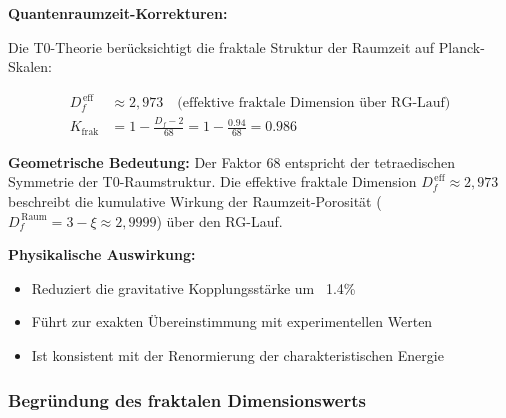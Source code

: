 	\begin{derivation}
		\textbf{Quantenraumzeit-Korrekturen:}
		
		Die T0-Theorie berücksichtigt die fraktale Struktur der Raumzeit auf Planck-Skalen:
		
		\begin{align}
			D_f^{\,\text{eff}} &\approx 2{,}973 \quad \text{(effektive fraktale Dimension über RG-Lauf)} \\
			K_{\text{frak}} &= 1 - \frac{D_f - 2}{68} = 1 - \frac{0.94}{68} = 0.986
		\end{align}
		
		\textbf{Geometrische Bedeutung:} 
		Der Faktor 68 entspricht der tetraedischen Symmetrie der T0-Raumstruktur. Die effektive fraktale Dimension $D_f^{\,\text{eff}} \approx 2{,}973$ beschreibt die kumulative Wirkung der Raumzeit-Porosität ($D_f^{\,\text{Raum}} = 3 - \xi \approx 2{,}9999$) über den RG-Lauf.
		
		\textbf{Physikalische Auswirkung:}
		\begin{itemize}
			\item Reduziert die gravitative Kopplungsstärke um ~1.4\%
			\item Führt zur exakten Übereinstimmung mit experimentellen Werten
			\item Ist konsistent mit der Renormierung der charakteristischen Energie
		\end{itemize}
	\end{derivation}
	
	\subsubsection{Begründung des fraktalen Dimensionswerts}
	
